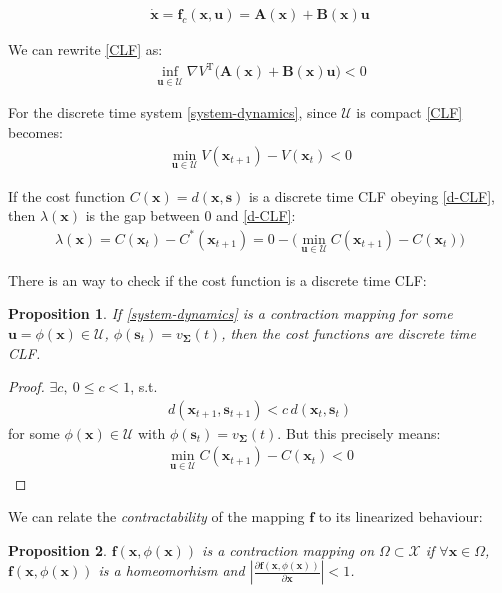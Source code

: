 \documentclass[10pt,a4paper]{article}
\newcommand{\state}{\mathbf{x}} %
\newcommand{\traj}{\mathbf{s}} %
\newcommand{\Traj}{\mathbf{\Sigma}}
\newcommand{\sysInput}{\mathbf{u}} %
\newtheorem{prop}{Proposition}[section]
\begin{document}
\begin{align}
\dot{\state} = \mathbf{f}_c(\state,\sysInput) = \mathbf{A}(\state) + \mathbf{B}(\state)\sysInput \label{control-affine}
\end{align}

We can rewrite \eqref{CLF} as:
\begin{align}
\inf_{\sysInput \in \mathcal{U}} \nabla V^{\mathrm{T}}\big(\mathbf{A}(\state) + \mathbf{B}(\state)\sysInput \big) < 0
\end{align}

For the discrete time system \eqref{system-dynamics}, since $\mathcal{U}$ is compact \eqref{CLF} becomes:
\begin{align}
\min_{\sysInput \in \mathcal{U}} V(\state_{t+1}) - V(\state_{t}) < 0 \label{d-CLF}
\end{align}

If the cost function $C(\state) = d(\state,\traj)$ is a discrete time CLF obeying \eqref{d-CLF}, then $\lambda(\state)$ is the gap between $0$ and \eqref{d-CLF}:
\begin{align}
\lambda(\state) = C(\state_{t}) - C^{*}(\state_{t+1}) = 0 - \big(\min_{\sysInput \in \mathcal{U}} C(\state_{t+1}) - C(\state_{t})\big)
\end{align}

There is an way to check if the cost function is a discrete time CLF:
\begin{prop}
If \eqref{system-dynamics} is a contraction mapping for some $\sysInput = \phi(\state) \in \mathcal{U}$, $\phi(\traj_t) = v_{\Traj}(t)$, then the cost functions are discrete time CLF.
\end{prop}

\begin{proof}
$\exists c, \ 0 \leq c < 1$, s.t.
\begin{align}
d(\state_{t+1}, \traj_{t+1}) < c \, d(\state_{t}, \traj_{t}) 
\end{align}
for some $\phi(\state) \in \mathcal{U}$ with $\phi(\traj_t) = v_{\Traj}(t)$. But this precisely means:
\begin{align}
\min_{\sysInput \in \mathcal{U}} C(\state_{t+1}) - C(\state_{t}) < 0
\end{align}
\end{proof}

We can relate the \emph{contractability} of the mapping $\mathbf{f}$ to its linearized behaviour:

\begin{prop}
$\mathbf{f}(\state, \phi(\state))$ is a contraction mapping on $\Omega \subset \mathcal{X}$ if $\forall \state \in \Omega$, $\mathbf{f}(\state, \phi(\state))$ is a homeomorhism and $\left\vert\frac{\partial \mathbf{f}(\state,\phi(\state))}{\partial \state}\right\vert < 1$.
\end{prop}
\end{document}
